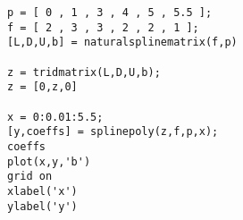 \begin{code} \label{codeQuest2}
\small
\begin{verbatim}
p = [ 0 , 1 , 3 , 4 , 5 , 5.5 ];
f = [ 2 , 3 , 3 , 2 , 2 , 1 ];
[L,D,U,b] = naturalsplinematrix(f,p)

z = tridmatrix(L,D,U,b);
z = [0,z,0]

x = 0:0.01:5.5;
[y,coeffs] = splinepoly(z,f,p,x);
coeffs
plot(x,y,'b')
grid on
xlabel('x')
ylabel('y')
\end{verbatim}
\end{code}


